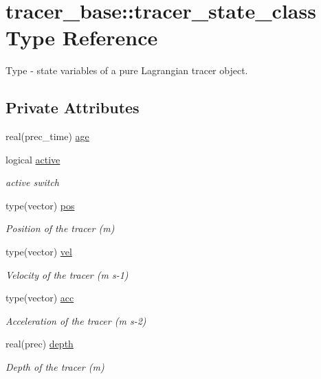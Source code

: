 \hypertarget{structtracer__base_1_1tracer__state__class}{}\section{tracer\+\_\+base\+:\+:tracer\+\_\+state\+\_\+class Type Reference}
\label{structtracer__base_1_1tracer__state__class}


Type -\/ state variables of a pure Lagrangian tracer object.  


\subsection*{Private Attributes}
\begin{DoxyCompactItemize}
\item 
real(prec\+\_\+time) \mbox{\hyperlink{structtracer__base_1_1tracer__state__class_a23ee8b78946c85f5e079ad0f5fc08b29}{age}}
\item 
logical \mbox{\hyperlink{structtracer__base_1_1tracer__state__class_aeb73b96dfbc525803fab32c3d3ae3ab8}{active}}
\begin{DoxyCompactList}\small\item\em active switch \end{DoxyCompactList}\item 
type(vector) \mbox{\hyperlink{structtracer__base_1_1tracer__state__class_a3c966719f4a6961697a7e939694cb550}{pos}}
\begin{DoxyCompactList}\small\item\em Position of the tracer (m) \end{DoxyCompactList}\item 
type(vector) \mbox{\hyperlink{structtracer__base_1_1tracer__state__class_a46296517bb40271bcff0fe9c85024e7c}{vel}}
\begin{DoxyCompactList}\small\item\em Velocity of the tracer (m s-\/1) \end{DoxyCompactList}\item 
type(vector) \mbox{\hyperlink{structtracer__base_1_1tracer__state__class_a5a66d6eaa3610d07fe073a04727ffb6e}{acc}}
\begin{DoxyCompactList}\small\item\em Acceleration of the tracer (m s-\/2) \end{DoxyCompactList}\item 
real(prec) \mbox{\hyperlink{structtracer__base_1_1tracer__state__class_a87200472c310a7b3f95653cd43eda82f}{depth}}
\begin{DoxyCompactList}\small\item\em Depth of the tracer (m) \end{DoxyCompactList}\end{DoxyCompactItemize}


